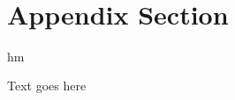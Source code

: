 \documentclass[12pt]{article}
\begin{document}










\newpage~\appendix

\section{Appendix Section}

hm

Text goes here
\end{document}
